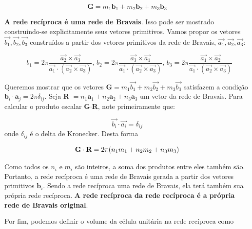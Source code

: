 		\begin{equation}
			\mathbf{G} = m_1\mathbf{b}_1 + m_2\mathbf{b}_2 + m_3\mathbf{b}_3 
		\end{equation}

		
		\textbf{A rede recíproca é uma rede de Bravais}. Isso pode ser mostrado construindo-se explicitamente seus vetores primitivos. Vamos propor os vetores $\vec{b_{1}}, \vec{b_{2}}, \vec{b_{3}}$ construídos a partir dos vetores primitivos da rede de Bravais, $\vec{a_{1}}, \vec{a_{2}}, \vec{a_{3}}$:
		
		\begin{equation}
		\label{eq_bravais_reciproca}
		\textbf{ $b_{1} = 2\pi \frac{\vec{a_{2}}\times\vec{a_{3}}}{\vec{a_{1}}\cdot (\vec{a_{2}} \times \vec{a_{3}})}$, 
			$b_{2} = 2\pi \frac{\vec{a_{3}}\times\vec{a_{1}}}{\vec{a_{1}}\cdot (\vec{a_{2}} \times \vec{a_{3}})}$, 
			$b_{3} = 2\pi \frac{\vec{a_{1}}\times\vec{a_{2}}}{\vec{a_{1}}\cdot (\vec{a_{2}} \times \vec{a_{3}})}$}
		\end{equation}
		
		Queremos mostrar que os vetores $\mathbf{G} = m_{1}\vec{b_{1}} + m_{2}\vec{b_{2}} + m_{3}\vec{b_{3}} $ satisfazem a condição $\mathbf{b}_i \cdot \mathbf{a}_j = 2\pi\delta_{ij}$. Seja \textbf{R} $= n_{1}\textbf{a}_{1}+ n_{2}\textbf{a}_2 + n_{3}\textbf{a}_3 $ um vetor da rede de Bravais. Para calcular o produto escalar \textbf{G}$\cdot$\textbf{R}, note primeiramente que: 

		\begin{equation}
		\label{eq_bravais_reciproca1}
		\textbf{$\vec{b_{i}}\cdot\vec{a_{i}} = \delta_{ij}$}
		\end{equation}
		onde $\delta_{ij}$ é o delta de Kronecker. Desta forma 
		
		\begin{equation}
		\label{eq_bravais_reciproca2}
		\textbf{$ \textbf{G}\cdot \textbf{R} =  2\pi(n_{1}m_{1} + n_{2}m_{2} + n_{3}m_{3}) $}
		\end{equation}
		
		Como todos os $n_{i}$ e $m_{i}$ são inteiros, a soma dos produtos entre eles também são. Portanto, a rede recíproca é uma rede de Bravais gerada a partir dos vetores primitivos $\mathbf{b}_i$. Sendo a rede recíproca uma rede de Bravais, ela terá também sua própria rede recíproca. \textbf{A rede recíproca da rede recíproca é a própria rede de Bravais original}. 
		
		Por fim, podemos definir o volume da célula unitária na rede recíproca como
		
